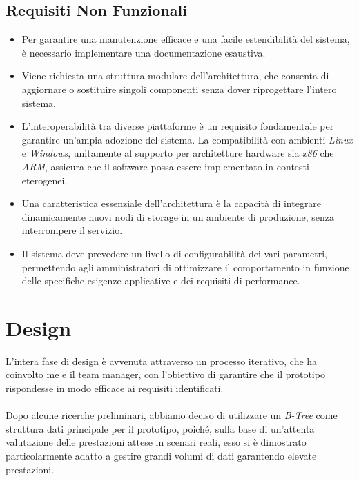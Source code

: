 \documentclass[12pt,a4paper,openright,twoside]{book}
\begin{document}
        \subsection{Requisiti Non Funzionali}

            \begin{itemize}
                \item Per garantire una manutenzione efficace e una facile estendibilità del sistema, è necessario implementare una documentazione esaustiva.
                \item Viene richiesta una struttura modulare dell’architettura, che consenta di aggiornare o sostituire singoli componenti senza dover riprogettare l’intero sistema.
                \item L’interoperabilità tra diverse piattaforme è un requisito fondamentale per garantire un’ampia adozione del sistema. La compatibilità con ambienti \textit{Linux} e \textit{Windows}, unitamente al supporto per architetture hardware sia \textit{x86} che \textit{ARM}, assicura che il software possa essere implementato in contesti eterogenei.
                \item Una caratteristica essenziale dell’architettura è la capacità di integrare dinamicamente nuovi nodi di storage in un ambiente di produzione, senza interrompere il servizio.
                \item Il sistema deve prevedere un livello di configurabilità dei vari parametri, permettendo agli amministratori di ottimizzare il comportamento in funzione delle specifiche esigenze applicative e dei requisiti di performance.
            \end{itemize}

    \pagebreak
    \section{Design}

        L'intera fase di design è avvenuta attraverso un processo iterativo, che ha coinvolto me e il team manager, con l'obiettivo di garantire che il prototipo rispondesse in modo efficace ai requisiti identificati.

        \paragraph*{}

        Dopo alcune ricerche preliminari, abbiamo deciso di utilizzare un \textit{B-Tree} come struttura dati principale per il prototipo, poiché, sulla base di un'attenta valutazione delle prestazioni attese in scenari reali, esso si è dimostrato particolarmente adatto a gestire grandi volumi di dati garantendo elevate prestazioni.
\end{document}
